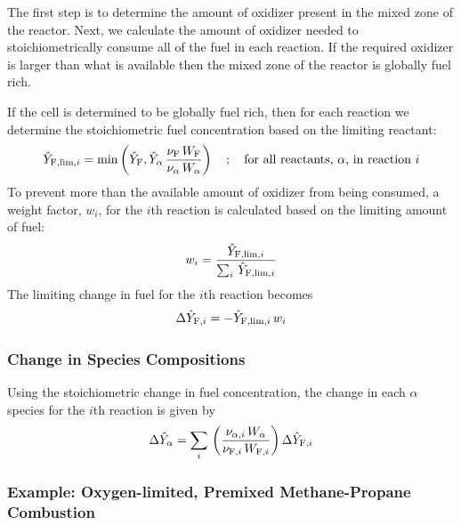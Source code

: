 The first step is to determine the amount of oxidizer present in the mixed zone of the reactor. Next, we calculate the amount of oxidizer needed to stoichiometrically consume all of the fuel in each reaction. If the required oxidizer is larger than what is available then the mixed zone of the reactor is globally fuel rich.

If the cell is determined to be globally fuel rich, then for each reaction we determine the stoichiometric fuel concentration based on the limiting reactant:
\begin{equation}\label{eq:stoich_fuel}
\hat{Y}_{{\rm F,lim},i} = \min \left( \hat{Y}_{\rm F}, \hat{Y}_{\alpha} \,\frac{\nu_{\rm F}\,W_{\rm F}}{\nu_{\alpha}\,W_{\alpha}} \right) \quad ; \quad \mbox{for all reactants, $\alpha$, in reaction $i$}
\end{equation}
To prevent more than the available amount of oxidizer from being consumed, a weight factor, $w_i$, for the $i$th reaction is calculated based on the limiting amount of fuel:
\begin{equation}\label{eq:fuel_weight}
w_i = \frac{\hat{Y}_{{\rm F,lim},i}}{\sum_i \, \hat{Y}_{{\rm F,lim},i}}
\end{equation}
The limiting change in fuel for the $i$th reaction becomes
\begin{equation}\label{eq:fuel_rate}
\Delta \hat{Y}_{{\rm F},i} = -\hat{Y}_{{\rm F,lim},i}\,w_i
\end{equation}

\subsubsection{Change in Species Compositions}

Using the stoichiometric change in fuel concentration, the change in each $\alpha$ species for the $i$th reaction is given by
\begin{equation}\label{eq:change_alpha}
\Delta \hat{Y}_{\alpha} = \sum_i \,\left(\frac{\nu_{\alpha,i} \,W_{\alpha}}{\nu_{{\rm F},i} \,W_{{\rm F},i}}\right)\Delta \hat{Y}_{{\rm F},i}
\end{equation}

\subsubsection{Example: Oxygen-limited, Premixed Methane-Propane Combustion}

